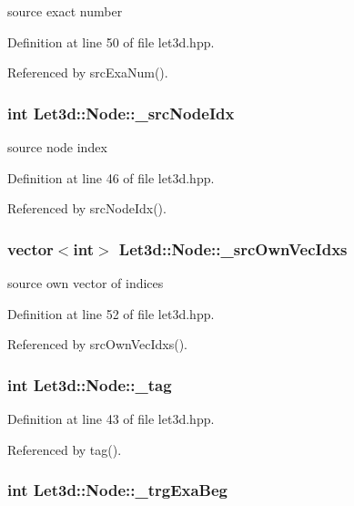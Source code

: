 source exact number 

Definition at line 50 of file let3d.hpp.

Referenced by src\-Exa\-Num().
\subsubsection{\setlength{\rightskip}{0pt plus 5cm}int {\bf Let3d::Node::\_\-src\-Node\-Idx}\hspace{0.3cm}{\tt  [protected]}}\label{classLet3d_1_1Node_0b73799cade5935fc13f0c771b31638f_0b73799cade5935fc13f0c771b31638f}


source node index 

Definition at line 46 of file let3d.hpp.

Referenced by src\-Node\-Idx().
\subsubsection{\setlength{\rightskip}{0pt plus 5cm}vector$<$int$>$ {\bf Let3d::Node::\_\-src\-Own\-Vec\-Idxs}\hspace{0.3cm}{\tt  [protected]}}\label{classLet3d_1_1Node_080e23fe7764a5b8f75f62ce70ec79a8_080e23fe7764a5b8f75f62ce70ec79a8}


source own vector of indices 

Definition at line 52 of file let3d.hpp.

Referenced by src\-Own\-Vec\-Idxs().
\subsubsection{\setlength{\rightskip}{0pt plus 5cm}int {\bf Let3d::Node::\_\-tag}\hspace{0.3cm}{\tt  [protected]}}\label{classLet3d_1_1Node_77940a0de3087721104e2e1139652c36_77940a0de3087721104e2e1139652c36}




Definition at line 43 of file let3d.hpp.

Referenced by tag().
\subsubsection{\setlength{\rightskip}{0pt plus 5cm}int {\bf Let3d::Node::\_\-trg\-Exa\-Beg}\hspace{0.3cm}{\tt  [protected]}}\label{classLet3d_1_1Node_35285eb16fc5ac392314acf5730068f4_35285eb16fc5ac392314acf5730068f4}


